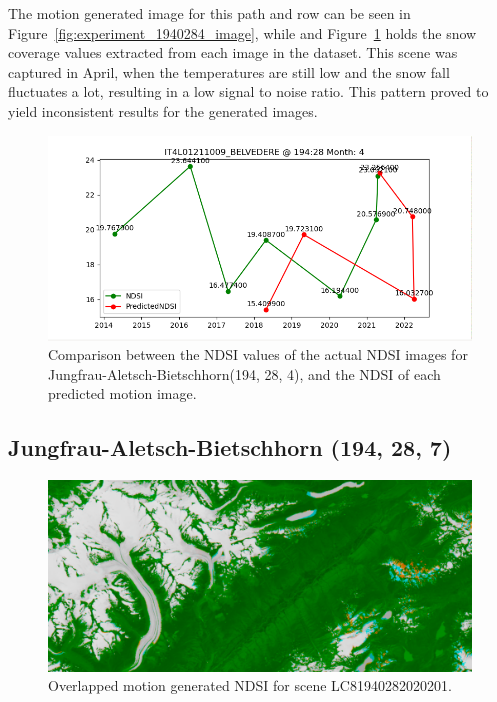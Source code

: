 \documentclass[12pt, a4paper]{report}
\begin{document}
	The motion generated image for this path and row can be seen in Figure~\ref{fig:experiment_1940284_image}, while and Figure~\ref{fig:jungfrau_194284} holds the snow coverage values extracted from each image in the dataset. This scene was captured in April, when the temperatures are still low and the snow fall fluctuates a lot, resulting in a low signal to noise ratio. This pattern proved to yield inconsistent results for the generated images.
	
	\begin{figure}[h!]
		\centering
		\includegraphics[scale=0.5]{../images/experiment_194284.png}
		\caption{Comparison between the NDSI values of the actual NDSI images for Jungfrau-Aletsch-Bietschhorn(194, 28, 4), and the NDSI of each predicted motion image.}
		\label{fig:jungfrau_194284}
	\end{figure}

	
	\newpage{}
	
	\subsection{Jungfrau-Aletsch-Bietschhorn (194, 28, 7)}
	
	\begin{figure}[h!]
		\centering
		\includegraphics[width=\linewidth]{../images/experiment_1940287_image.png}
		\caption{Overlapped motion generated NDSI for scene LC81940282020201.}
		\label{fig:experiment_1940287_image}
	\end{figure}
	
\end{document}
